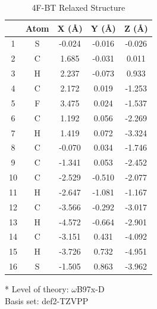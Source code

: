 \begin{table}[hbt!]\centering
\caption{4F-BT Relaxed Structure}
\renewcommand{\arraystretch}{1.5}
\begin{threeparttable}
\begin{tabular}{ccccc}\toprule
{} & {Atom} & {X (\AA)} & {Y (\AA)} & {Z (\AA)} \\ \midrule
1 & S & -0.024 & -0.016 & -0.026\\
2 & C & 1.685 & -0.031 & 0.011\\
3 & H & 2.237 & -0.073 & 0.933\\
4 & C & 2.172 & 0.019 & -1.253\\
5 & F & 3.475 & 0.024 & -1.537\\
6 & C & 1.192 & 0.056 & -2.269\\
7 & H & 1.419 & 0.072 & -3.324\\
8 & C & -0.070 & 0.034 & -1.746\\
9 & C & -1.341 & 0.053 & -2.452\\
10 & C & -2.529 & -0.510 & -2.077\\
11 & H & -2.647 & -1.081 & -1.167\\
12 & C & -3.566 & -0.292 & -3.017\\
13 & H & -4.572 & -0.664 & -2.901\\
14 & C & -3.151 & 0.431 & -4.092\\
15 & H & -3.726 & 0.732 & -4.951\\
16 & S & -1.505 & 0.863 & -3.962\\ \bottomrule
\end{tabular}
\begin{tablenotes}
\item[*] \footnotesize Level of theory: $\omega$B97x-D \\ Basis set: def2-TZVPP
\end{tablenotes}
\end{threeparttable}
\end{table}
